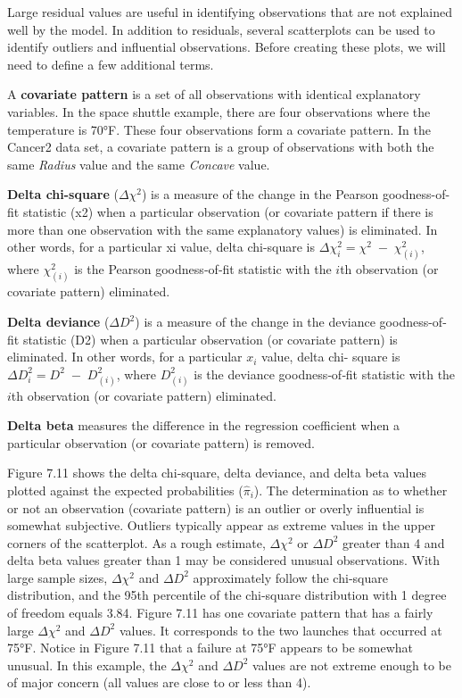 \documentclass[
]{report}
\begin{document}
Large residual values are useful in identifying observations that are not explained well by the model. In addition to residuals, several scatterplots can be used to identify outliers and influential observations. Before creating these plots, we will need to define a few additional terms.

A \textbf{covariate pattern} is a set of all observations with identical explanatory variables. In the space shuttle example, there are four observations where the temperature is 70°F. These four observations form a covariate pattern. In the Cancer2 data set, a covariate pattern is a group of observations with both the same \emph{Radius} value and the same \emph{Concave} value.

\textbf{Delta chi-square} (\(\Delta \chi^2\)) is a measure of the change in the Pearson goodness-of-fit statistic (x2) when a
particular observation (or covariate pattern if there is more than one observation with the same explanatory
values) is eliminated. In other words, for a particular xi value, delta chi-square is \(\Delta \chi^2_i = \chi^2 \;-\;\chi^2_{(i)}\), where \(\chi^2_{(i)}\) is the Pearson goodness‐of‐fit statistic with the \(i\)th observation (or covariate pattern) eliminated.

\textbf{Delta deviance} (\(\Delta D^2\)) is a measure of the change in the deviance goodness-of-fit statistic (D2) when a
particular observation (or covariate pattern) is eliminated. In other words, for a particular \(x_i\) value, delta chi-
square is \(\Delta D^2_i = D^2 \;-\; D^2_{(i)}\), where \(D^2_{(i)}\) is the deviance goodness‐of‐fit statistic with the \(i\)th observation (or covariate pattern) eliminated.

\textbf{Delta beta} measures the difference in the regression coefficient when a particular observation (or covariate pattern) is removed.

Figure 7.11 shows the delta chi‐square, delta deviance, and delta beta values plotted against the expected probabilities (\(\hat\pi_i\)). The determination as to whether or not an observation (covariate pattern) is an outlier or overly influential is somewhat subjective. Outliers typically appear as extreme values in the upper corners of the scatterplot. As a rough estimate, \(\Delta\chi^2\) or \(\Delta D^2\) greater than 4 and delta beta values greater than 1 may be considered unusual observations. With large sample sizes, \(\Delta\chi^2\) and \(\Delta D^2\) approximately follow the chi‐square distribution, and the 95th percentile of the chi‐square distribution with 1 degree of freedom equals 3.84. Figure 7.11 has one covariate pattern that has a fairly large \(\Delta\chi^2\) and \(\Delta D^2\) values. It corresponds to the two launches that occurred at 75°F. Notice in Figure 7.11 that a failure at 75°F appears to be somewhat unusual. In this example, the \(\Delta\chi^2\) and \(\Delta D^2\) values are not extreme enough to be of major concern (all values are close to or less than 4).
\end{document}
